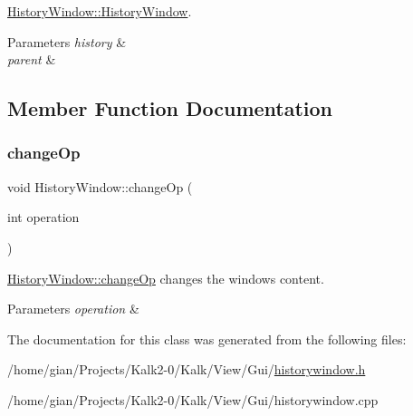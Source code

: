 \hyperlink{class_history_window_ad545b50ee9a83c213221b3d937252d31}{History\+Window\+::\+History\+Window}. 


\begin{DoxyParams}{Parameters}
{\em history} & \\
\hline
{\em parent} & \\
\hline
\end{DoxyParams}


\subsection{Member Function Documentation}
\mbox{\label{class_history_window_aa1baf09cc1f8dfc65b3647ca783cef43}} 
\subsubsection{\texorpdfstring{change\+Op}{changeOp}}
{\footnotesize\ttfamily void History\+Window\+::change\+Op (\begin{DoxyParamCaption}\item[{int}]{operation }\end{DoxyParamCaption})\hspace{0.3cm}{\ttfamily [slot]}}



\hyperlink{class_history_window_aa1baf09cc1f8dfc65b3647ca783cef43}{History\+Window\+::change\+Op} changes the window\textquotesingle{}s content. 


\begin{DoxyParams}{Parameters}
{\em operation} & \\
\hline
\end{DoxyParams}


The documentation for this class was generated from the following files\+:\begin{DoxyCompactItemize}
\item 
/home/gian/\+Projects/\+Kalk2-\/0/\+Kalk/\+View/\+Gui/\hyperlink{historywindow_8h}{historywindow.\+h}\item 
/home/gian/\+Projects/\+Kalk2-\/0/\+Kalk/\+View/\+Gui/historywindow.\+cpp\end{DoxyCompactItemize}
